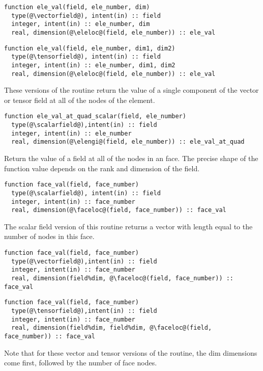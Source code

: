 \documentclass[a4paper, 11pt]{book}
\begin{document}
\begin{lstlisting}
function ele_val(field, ele_number, dim) 
  type(@\vectorfield@), intent(in) :: field
  integer, intent(in) :: ele_number, dim
  real, dimension(@\eleloc@(field, ele_number)) :: ele_val
\end{lstlisting}
\begin{lstlisting}
function ele_val(field, ele_number, dim1, dim2) 
  type(@\tensorfield@), intent(in) :: field
  integer, intent(in) :: ele_number, dim1, dim2
  real, dimension(@\eleloc@(field, ele_number)) :: ele_val
\end{lstlisting}
These versions of the routine return the value of a single component of the
vector or tensor field at all of the nodes of the element. 


\begin{lstlisting}
function ele_val_at_quad_scalar(field, ele_number)
  type(@\scalarfield@),intent(in) :: field
  integer, intent(in) :: ele_number
  real, dimension(@\elengi@(field, ele_number)) :: ele_val_at_quad  
\end{lstlisting}


Return the value of a field at all of the nodes in an face. The precise
shape of the function value depends on the rank and dimension of the field.

\begin{lstlisting}
function face_val(field, face_number) 
  type(@\scalarfield@), intent(in) :: field
  integer, intent(in) :: face_number
  real, dimension(@\faceloc@(field, face_number)) :: face_val
\end{lstlisting}
The scalar field version of this routine returns a vector with length equal
to the number of nodes in this face.

\begin{lstlisting}
function face_val(field, face_number)
  type(@\vectorfield@),intent(in) :: field
  integer, intent(in) :: face_number
  real, dimension(field%dim, @\faceloc@(field, face_number)) :: face_val
\end{lstlisting}
\begin{lstlisting}
function face_val(field, face_number)
  type(@\tensorfield@),intent(in) :: field
  integer, intent(in) :: face_number
  real, dimension(field%dim, field%dim, @\faceloc@(field, face_number)) :: face_val
\end{lstlisting}
Note that for these vector and tensor versions of the routine, the dim
dimensions come first, followed by the number of face nodes.
\end{document}
